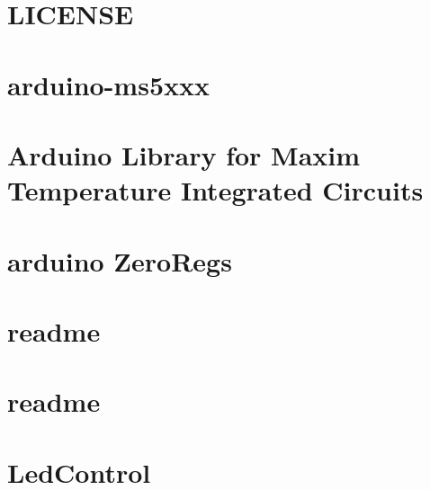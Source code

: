 \documentclass[twoside]{book}
\newcommand{\+}{\discretionary{\mbox{\scriptsize$\hookleftarrow$}}{}{}}
\begin{document}
\chapter{L\+I\+C\+E\+N\+SE}
\label{md_Weather_Balloon_library_arduino-ms5xxx-master_LICENSE}
\hypertarget{md_Weather_Balloon_library_arduino-ms5xxx-master_LICENSE}{}

\chapter{arduino-\/ms5xxx}
\label{md_Weather_Balloon_library_arduino-ms5xxx-master_README}
\hypertarget{md_Weather_Balloon_library_arduino-ms5xxx-master_README}{}

\chapter{Arduino Library for Maxim Temperature Integrated Circuits}
\label{md_Weather_Balloon_library_Arduino-Temperature-Control-Library_README}
\hypertarget{md_Weather_Balloon_library_Arduino-Temperature-Control-Library_README}{}

\chapter{arduino Zero\+Regs}
\label{md_Weather_Balloon_library_arduino-ZeroRegs_README}
\hypertarget{md_Weather_Balloon_library_arduino-ZeroRegs_README}{}

\chapter{readme}
\label{md_Weather_Balloon_library_Firmata_readme}
\hypertarget{md_Weather_Balloon_library_Firmata_readme}{}

\chapter{readme}
\label{md_Weather_Balloon_library_Firmata_test_readme}
\hypertarget{md_Weather_Balloon_library_Firmata_test_readme}{}

\chapter{Led\+Control}
\label{md_Weather_Balloon_library_LedControl-master_README}
\hypertarget{md_Weather_Balloon_library_LedControl-master_README}{}

\end{document}
